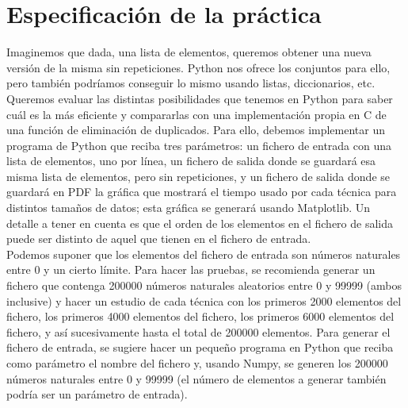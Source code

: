 \documentclass[12 pt]{article}
\begin{document}
\section{Especificación de la práctica}
Imaginemos que dada, una lista de elementos, queremos obtener una nueva versión de la misma sin
repeticiones. Python nos ofrece los conjuntos para ello, pero también podríamos conseguir lo mismo
usando listas, diccionarios, etc. Queremos evaluar las distintas posibilidades que tenemos en Python
para saber cuál es la más eficiente y compararlas con una implementación propia en C de una función
de eliminación de duplicados. Para ello, debemos implementar un programa de Python que reciba tres
parámetros: un fichero de entrada con una lista de elementos, uno por línea, un fichero de salida donde
se guardará esa misma lista de elementos, pero sin repeticiones, y un fichero de salida donde se guardará en PDF la gráfica que mostrará el tiempo usado por cada técnica para distintos tamaños de datos; esta gráfica se generará usando Matplotlib. Un detalle a tener en cuenta es que el orden de los elementos en el fichero de salida puede ser distinto de aquel que tienen en el fichero de entrada.\\

Podemos suponer que los elementos del fichero de entrada son números naturales entre 0 y un cierto
límite. Para hacer las pruebas, se recomienda generar un fichero que contenga 200000 números naturales
aleatorios entre 0 y 99999 (ambos inclusive) y hacer un estudio de cada técnica con los primeros 2000
elementos del fichero, los primeros 4000 elementos del fichero, los primeros 6000 elementos del fichero, y
así sucesivamente hasta el total de 200000 elementos. Para generar el fichero de entrada, se sugiere hacer
un pequeño programa en Python que reciba como parámetro el nombre del fichero y, usando Numpy, se
generen los 200000 números naturales entre 0 y 99999 (el número de elementos a generar también podría
ser un parámetro de entrada).\\
\end{document}
